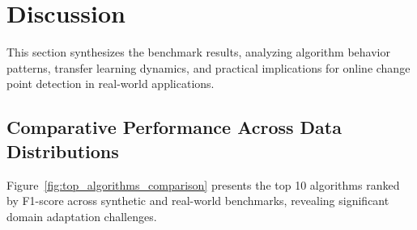 \documentclass[journal,article,submit,pdftex,moreauthors]{Definitions/mdpi}
\begin{document}




\section{Discussion}

This section synthesizes the benchmark results, analyzing algorithm behavior patterns, transfer learning dynamics, and practical implications for online change point detection in real-world applications.

\subsection{Comparative Performance Across Data Distributions}

Figure~\ref{fig:top_algorithms_comparison} presents the top 10 algorithms ranked by F1-score across synthetic and real-world benchmarks, revealing significant domain adaptation challenges.
\end{document}
